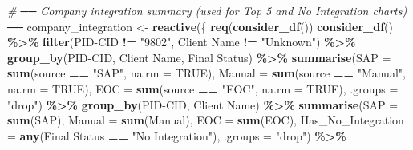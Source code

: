 \documentclass[
]{article}
\newenvironment{Shaded}{\begin{snugshade}}{\end{snugshade}}
\newcommand{\AttributeTok}[1]{\textcolor[rgb]{0.13,0.29,0.53}{#1}}
\newcommand{\CommentTok}[1]{\textcolor[rgb]{0.56,0.35,0.01}{\textit{#1}}}
\newcommand{\ConstantTok}[1]{\textcolor[rgb]{0.56,0.35,0.01}{#1}}
\newcommand{\FunctionTok}[1]{\textcolor[rgb]{0.13,0.29,0.53}{\textbf{#1}}}
\newcommand{\NormalTok}[1]{#1}
\newcommand{\OtherTok}[1]{\textcolor[rgb]{0.56,0.35,0.01}{#1}}
\newcommand{\SpecialCharTok}[1]{\textcolor[rgb]{0.81,0.36,0.00}{\textbf{#1}}}
\newcommand{\StringTok}[1]{\textcolor[rgb]{0.31,0.60,0.02}{#1}}
\begin{document}
\begin{Shaded}
\begin{Highlighting}[]
    \CommentTok{\# ── Company integration summary (used for Top 5 and No Integration charts) ──}
\NormalTok{    company\_integration }\OtherTok{\textless{}{-}} \FunctionTok{reactive}\NormalTok{(\{}
      \FunctionTok{req}\NormalTok{(}\FunctionTok{consider\_df}\NormalTok{())}
      \FunctionTok{consider\_df}\NormalTok{() }\SpecialCharTok{\%\textgreater{}\%}
        \FunctionTok{filter}\NormalTok{(}\StringTok{\textasciigrave{}}\AttributeTok{PID{-}CID}\StringTok{\textasciigrave{}} \SpecialCharTok{!=} \StringTok{"9802"}\NormalTok{, }\StringTok{\textasciigrave{}}\AttributeTok{Client Name}\StringTok{\textasciigrave{}} \SpecialCharTok{!=} \StringTok{"Unknown"}\NormalTok{) }\SpecialCharTok{\%\textgreater{}\%}
        \FunctionTok{group\_by}\NormalTok{(}\StringTok{\textasciigrave{}}\AttributeTok{PID{-}CID}\StringTok{\textasciigrave{}}\NormalTok{, }\StringTok{\textasciigrave{}}\AttributeTok{Client Name}\StringTok{\textasciigrave{}}\NormalTok{, }\StringTok{\textasciigrave{}}\AttributeTok{Final Status}\StringTok{\textasciigrave{}}\NormalTok{) }\SpecialCharTok{\%\textgreater{}\%}
        \FunctionTok{summarise}\NormalTok{(}\AttributeTok{SAP    =} \FunctionTok{sum}\NormalTok{(source }\SpecialCharTok{==} \StringTok{"SAP"}\NormalTok{,    }\AttributeTok{na.rm =} \ConstantTok{TRUE}\NormalTok{),}
                  \AttributeTok{Manual =} \FunctionTok{sum}\NormalTok{(source }\SpecialCharTok{==} \StringTok{"Manual"}\NormalTok{, }\AttributeTok{na.rm =} \ConstantTok{TRUE}\NormalTok{),}
                  \AttributeTok{EOC    =} \FunctionTok{sum}\NormalTok{(source }\SpecialCharTok{==} \StringTok{"EOC"}\NormalTok{,    }\AttributeTok{na.rm =} \ConstantTok{TRUE}\NormalTok{), }\AttributeTok{.groups =} \StringTok{"drop"}\NormalTok{) }\SpecialCharTok{\%\textgreater{}\%}
        \FunctionTok{group\_by}\NormalTok{(}\StringTok{\textasciigrave{}}\AttributeTok{PID{-}CID}\StringTok{\textasciigrave{}}\NormalTok{, }\StringTok{\textasciigrave{}}\AttributeTok{Client Name}\StringTok{\textasciigrave{}}\NormalTok{) }\SpecialCharTok{\%\textgreater{}\%}
        \FunctionTok{summarise}\NormalTok{(}\AttributeTok{SAP    =} \FunctionTok{sum}\NormalTok{(SAP),}
                  \AttributeTok{Manual =} \FunctionTok{sum}\NormalTok{(Manual),}
                  \AttributeTok{EOC    =} \FunctionTok{sum}\NormalTok{(EOC),}
                  \AttributeTok{Has\_No\_Integration =} \FunctionTok{any}\NormalTok{(}\StringTok{\textasciigrave{}}\AttributeTok{Final Status}\StringTok{\textasciigrave{}} \SpecialCharTok{==} \StringTok{"No Integration"}\NormalTok{),}
                  \AttributeTok{.groups =} \StringTok{"drop"}\NormalTok{) }\SpecialCharTok{\%\textgreater{}\%}

\end{Highlighting}
\end{Shaded}
\end{document}

